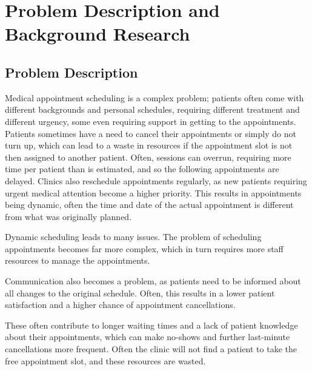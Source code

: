 
\chapter{Problem Description and Background Research} %

\label{Chapter3} %



\section{Problem Description}

Medical appointment scheduling is a complex problem; patients often come with different backgrounds and personal schedules, requiring different treatment and different urgency, some even requiring support in getting to the appointments. Patients sometimes have a need to cancel their appointments or simply do not turn up, which can lead to a waste in resources if the appointment slot is not then assigned to another patient. Often, sessions can overrun, requiring more time per patient than is estimated, and so the following appointments are delayed. Clinics also reschedule appointments regularly, as new patients requiring urgent medical attention become a higher priority. This results in appointments being dynamic, often the time and date of the actual appointment is different from what was originally planned.

Dynamic scheduling leads to many issues. The problem of scheduling appointments becomes far more complex, which in turn requires more staff resources to manage the appointments.

Communication also becomes a problem, as patients need to be informed about all changes to the original schedule. Often, this results in a lower patient satisfaction and a higher chance of appointment cancellations.

These often contribute to longer waiting times and a lack of patient knowledge about their appointments, which can make no-shows and further last-minute cancellations more frequent. Often the clinic will not find a patient to take the free appointment slot, and these resources are wasted.

